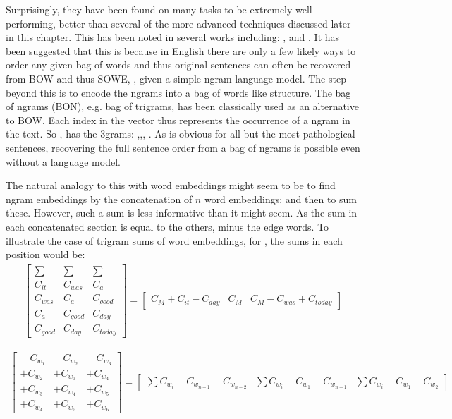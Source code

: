 \documentclass[12pt,parskip]{komatufte}
\begin{document}
Surprisingly, they have been found on many tasks to be extremely well performing, better than several of the more advanced techniques discussed later in this chapter.
This has been noted in several works including: ,  and .
It has been suggested that this is because in English there are only a few likely ways to order any given bag of words and thus original sentences can often be recovered from BOW  and thus SOWE, , given a simple ngram language model.
The step beyond this is to encode the ngrams into a bag of words like structure.
The bag of ngrams (BON), e.g. bag of trigrams, has been classically used as an alternative to BOW.
Each index in the vector thus represents the occurrence of a ngram in the text.
So , has the 3grams: ,,, .
As is obvious for all but the most pathological sentences, recovering the full sentence order from a bag of ngrams is possible even without a language model.

The natural analogy to this with word embeddings might seem to be to find ngram embeddings by the concatenation of $n$ word embeddings; and then to sum these.
However, such a sum is less informative than it might seem.
As the sum in each concatenated section is equal to the others, minus the edge words. To illustrate the case of trigram sums of word embeddings, for ,
the sums in each position would be:
\begin{align}
\left[\begin{array}{c|c|c}
	\sum & \sum & \sum\\
	C_{it} & C_{was} & C_{a}\\
	C_{was} & C_{a} & C_{good}\\
	C_{a} & C_{good} & C_{day}\\
	C_{good} & C_{day} & C_{today}
\end{array}\right]=\left[\begin{array}{c|c|c}
	C_{M}+C_{it}-C_{day} & C_{M} & C_{M}-C_{was}+C_{today}\end{array}\right]
\end{align}

\begin{align}
\left[\begin{array}{c|c|c}
	\quad C_{w_{1}} & \quad C_{w_{2}} & \quad C_{w_{3}}\\
	+C_{w_{2}} & +C_{w_{3}} & +C_{w_{4}}\\
	+C_{w_{3}} & +C_{w_{4}} & +C_{w_{5}}\\
	+C_{w_{4}} & +C_{w_{5}} & +C_{w_{6}}
\end{array}\right]=\left[\begin{array}{c|c|c}
	\sum C_{w_{i}}-C_{w_{n-1}}-C_{w_{n-2}} & \sum C_{w_{i}}-C_{w_{1}}-C_{w_{n-1}} & \sum C_{w_{i}}-C_{w_{1}}-C_{w_{2}}\end{array}\right]
\end{align}
\end{document}
